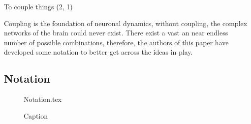 \documentclass[class={myRUCProject}, crop=false]{standalone}
\begin{document}
To couple things (2, 1) 



Coupling is the foundation of neuronal dynamics, without coupling, the complex networks of the brain could never exist. There exist a vast an near endless number of possible combinations, therefore, the authors of this paper have developed some notation to better get across the ideas in play.

\subsection{Notation}

\begin{figure}
    \centering
    {Notation.tex}
    \caption{Caption}\label{fig:notation}
\end{figure}
\end{document}
